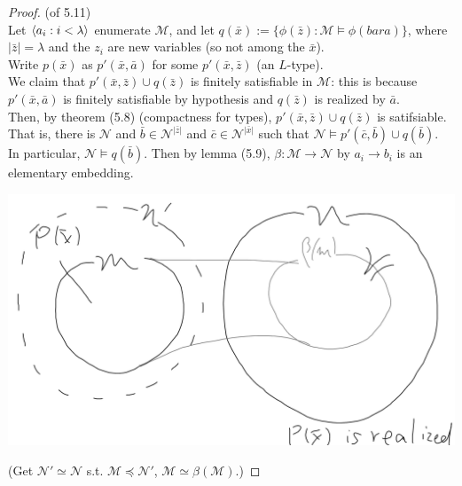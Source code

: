 \documentclass[a4paper]{article}
\begin{document}
\begin{proof} (of 5.11)\\
    Let $\langle a_i:i<\lambda \rangle$ enumerate $\mathcal{M}$, and let $q(\bar{x}) := \{\phi(\bar{z}): \mathcal{M} \vDash \phi(bar{a})\}$, where $|\bar{z}| = \lambda$ and the $z_i$ are new variables (so not among the $\bar{x}$).\\
    Write $p(\bar{x})$ as $p'(\bar{x},\bar{a})$ for some $p'(\bar{x},\bar{z})$ (an $L$-type).\\
    We claim that $p'(\bar{x},\bar{z}) \cup q(\bar{z})$ is finitely satisfiable in $\mathcal{M}$: this is because $p'(\bar{x},\bar{a})$ is finitely satisfiable by hypothesis and $q(\bar{z})$ is realized by $\bar{a}$.\\
    Then, by theorem (5.8) (compactness for types), $p'(\bar{x},\bar{z}) \cup q(\bar{z})$ is satifsiable.\\
    That is, there is $\mathcal{N}$ and $\bar{b} \in \mathcal{N}^{|\bar{z}|}$ and $\bar{c} \in \mathcal{N}^{|\bar{x}|}$ such that $\mathcal{N} \vDash p'(\bar{c},\bar{b}) \cup q(\bar{b})$.\\
    In particular, $\mathcal{N} \vDash q(\bar{b})$. Then by lemma (5.9), $\beta: \mathcal{M} \to \mathcal{N}$ by $a_i \to b_i$ is an elementary embedding.

    \includegraphics[scale=0.5]{image/Model_07.png}

    (Get $\mathcal{N}' \simeq \mathcal{N}$ s.t. $\mathcal{M} \preccurlyeq \mathcal{N}'$, $\mathcal{M} \simeq \beta(\mathcal{M})$.)
\end{proof}
\end{document}
